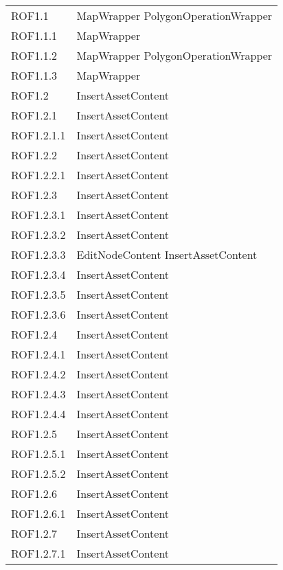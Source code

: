 \begin{longtable}{p{2.5cm}!{\VRule[1pt]}p{5cm}}
		ROF1.1 & MapWrapper \newline PolygonOperationWrapper\\
		ROF1.1.1 & MapWrapper\\
		ROF1.1.2 & MapWrapper \newline PolygonOperationWrapper\\
		ROF1.1.3 & MapWrapper\\
		ROF1.2 & InsertAssetContent\\
		ROF1.2.1 & InsertAssetContent\\
		ROF1.2.1.1 & InsertAssetContent\\
		ROF1.2.2 & InsertAssetContent\\
		ROF1.2.2.1 & InsertAssetContent\\
		ROF1.2.3 & InsertAssetContent\\
		ROF1.2.3.1 & InsertAssetContent\\
		ROF1.2.3.2 & InsertAssetContent\\
		ROF1.2.3.3 & EditNodeContent \newline InsertAssetContent\\
		ROF1.2.3.4 & InsertAssetContent\\
		ROF1.2.3.5 & InsertAssetContent\\
		ROF1.2.3.6 & InsertAssetContent\\
		ROF1.2.4 & InsertAssetContent\\
		ROF1.2.4.1 & InsertAssetContent\\
		ROF1.2.4.2 & InsertAssetContent\\
		ROF1.2.4.3 & InsertAssetContent\\
		ROF1.2.4.4 & InsertAssetContent\\
		ROF1.2.5 & InsertAssetContent\\
		ROF1.2.5.1 & InsertAssetContent\\
		ROF1.2.5.2 & InsertAssetContent\\
		ROF1.2.6 & InsertAssetContent\\
		ROF1.2.6.1 & InsertAssetContent\\
		ROF1.2.7 & InsertAssetContent\\
		ROF1.2.7.1 & InsertAssetContent\\

\end{longtable}
